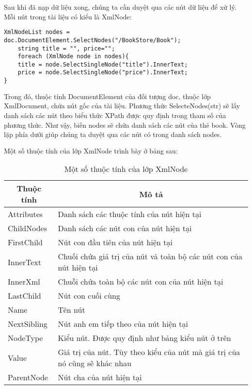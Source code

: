 Sau khi đã nạp dữ liệu xong, chúng ta cần duyệt qua các nút dữ liệu để xử lý. Mỗi nút trong tài liệu có kiểu là XmlNode:
\lstset{language=XML}
\begin{lstlisting}[escapechar=`]
	XmlNodeList nodes = doc.DocumentElement.SelectNodes("/BookStore/Book");
	string title = "", price="";
	foreach (XmlNode node in nodes){
	title = node.SelectSingleNode("title").InnerText;
	price = node.SelectSingleNode("price").InnerText;
}
\end{lstlisting}

Trong đó, thuộc tính DocumentElement của đối tượng doc, thuộc lớp XmlDocument, chứa nút gốc của tài liệu. Phương thức SelecteNodes(str) sẽ lấy danh sách các nút theo biểu thức XPath được quy định trong tham số của phương thức. Như vậy, biến nodes sẽ chứa danh sách các nút của thẻ book. Vòng lặp phía dưới giúp chúng ta duyệt qua các nút có trong danh sách nodes. 

Một số thuộc tính của lớp XmlNode trình bày ở bảng sau:

\begin{center}
\begin{longtable}{|m{4cm}|m{7cm}|}
\caption [Một số thuộc tính của lớp XmlNode]{Một số thuộc tính của lớp XmlNode}
   \endfirsthead
   \endhead
\hline
\multicolumn{1}{|c|}{\textbf{Thuộc tính}} &	\multicolumn{1}{|c|}{\textbf{Mô tả}}\\ \hline
Attributes &	Danh sách các thuộc tính của nút hiện tại\\ \hline
ChildNodes &	Danh sách các nút con của nút hiện tại\\ \hline
FirstChild &	Nút con đầu tiên của nút hiện tại\\ \hline
InnerText &	Chuối chứa giá trị của nút và toàn bộ các nút con của nút hiện tại\\ \hline
InnerXml &	Chuỗi chứa toàn bộ các nút con của nút hiện tại\\ \hline
LastChild &	Nút con cuối cùng\\ \hline
Name &	Tên nút\\ \hline
NextSibling &	Nút anh em tiếp theo của nút hiện tại\\ \hline
NodeType &	Kiểu nút. Được quy định như bảng kiểu nút ở trên\\ \hline
Value &	Giá trị của nút. Tùy theo kiểu của nút mà giá trị của nó cũng sẽ khác nhau\\ \hline
ParentNode &	Nút cha của nút hiện tại\\ \hline

\end{longtable}
\end{center}
\vspace{-1cm}

